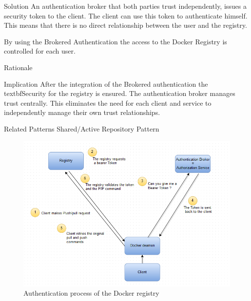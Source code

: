 \begin{patdescription}
\item[Solution] 
An authentication broker that both parties trust independently, issues a security token to the client. The client can use this token to authenticate himself. This means that there is no direct relationship between the user and the registry.

By using the Brokered Authentication the access to the Docker Registry is controlled for each user.


\item[Rationale] 

\item[Implication] After the integration of the Brokered authentication the textbf{Security} for the registry is ensured. %
The authentication broker manages trust centrally. This eliminates the need for each client and service to independently manage their own trust relationships.

\item [Related Patterns]
Shared/Active Repository Pattern

\end{patdescription}

\begin{figure}[H]
\centering
\includegraphics[scale=0.7]{5-patterns/images/Authentication.png}
\caption{Authentication process of the Docker registry }
\label{fig:auth-process}
\end{figure}

